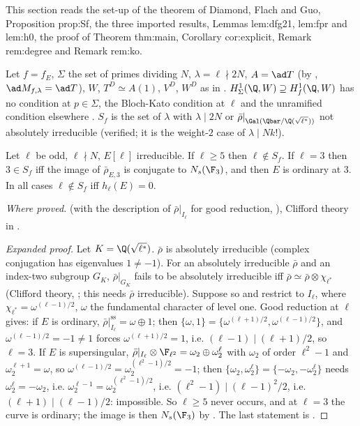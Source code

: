 \begin{sloppypar}
This section reads the set-up of the theorem of Diamond, Flach and Guo, Proposition prop:Sf, the three imported results, Lemmas lem:dfg21, lem:fpr and
lem:h0, the proof of Theorem thm:main, Corollary cor:explicit, Remark rem:degree and Remark rem:ko.

\begin{definition}\label{def:paper:selmer-setup}
Let $f=f_E$, $\Sigma$ the set of primes dividing $N$, $\lambda=\ell\nmid2N$, $A=\ad T$ (by , $\ad M_{f,\lambda}=\ad T$), $W$, $T^D\simeq A(1)$, $V^D$, $W^D$ as in
. $H^1_\Sigma(\Q,W)\supseteq H^1_f(\Q,W)$ has no condition at $p\in\Sigma$, the Bloch-Kato condition at $\ell$ and the unramified condition elsewhere \cite[Section 2.1]{DFG04}.
$S_f$ is the set of $\lambda$ with $\lambda\mid2N$ or $\bar\rho|_{\Gal(\Qbar/\Q(\sqrt{\ell^*}))}$ not absolutely irreducible \cite[(31)]{DFG04} (verified; it is the weight-$2$ case of $\lambda\mid Nk!$).
\end{definition}

\begin{proposition}\label{prop:paper:Sf}
Let $\ell$ be odd, $\ell\nmid N$, $E[\ell]$ irreducible. If $\ell\ge5$ then $\ell\notin S_f$. If $\ell=3$ then $3\in S_f$ iff the image of $\bar\rho_{E,3}$ is conjugate to $N_s(\F_3)$, and then $E$ is
ordinary at $3$. In all cases $\ell\notin S_f$ iff $h_\ell(E)=0$.
\end{proposition}

\noindent\emph{Where proved.}  (with the description of $\bar\rho|_{I_\ell}$ for good reduction, \cite[Section 1]{Serre72}), Clifford theory in .

\begin{proof}[Expanded proof]
Let $K=\Q(\sqrt{\ell^*})$. $\bar\rho$ is absolutely irreducible (complex conjugation has eigenvalues $1\ne-1$). For an absolutely irreducible $\bar\rho$ and an index-two subgroup $G_K$,
$\bar\rho|_{G_K}$ fails to be absolutely irreducible iff $\bar\rho\simeq\bar\rho\otimes\chi_{\ell^*}$ (Clifford theory, ; this needs $\bar\rho$ irreducible). Suppose so and restrict to $I_\ell$,
where $\chi_{\ell^*}=\omega^{(\ell-1)/2}$, $\omega$ the fundamental character of level one. Good reduction at $\ell$ gives: if $E$ is ordinary, $\bar\rho|_{I_\ell}^{\mathrm{ss}}=\omega\oplus1$; then
$\{\omega,1\}=\{\omega^{(\ell+1)/2},\omega^{(\ell-1)/2}\}$, and $\omega^{(\ell-1)/2}=-1\ne1$ forces $\omega^{(\ell+1)/2}=1$, i.e. $(\ell-1)\mid(\ell+1)/2$, so $\ell=3$. If $E$ is supersingular, $\bar\rho|_{I_\ell}\otimes\F_{\ell^2}=\omega_2\oplus\omega_2^\ell$
with $\omega_2$ of order $\ell^2-1$ and $\omega_2^{\ell+1}=\omega$, so $\omega^{(\ell-1)/2}=\omega_2^{(\ell^2-1)/2}=-1$; then $\{\omega_2,\omega_2^\ell\}=\{-\omega_2,-\omega_2^\ell\}$ needs $\omega_2^\ell=-\omega_2$, i.e.
$\omega_2^{\ell-1}=\omega_2^{(\ell^2-1)/2}$, i.e. $(\ell^2-1)\mid(\ell-1)^2/2$, i.e. $(\ell+1)\mid(\ell-1)/2$: impossible. So $\ell\ge5$ never occurs, and at $\ell=3$ the curve is ordinary; the image is
then $N_s(\F_3)$ by . The last statement is .
\end{proof}


\end{sloppypar}
